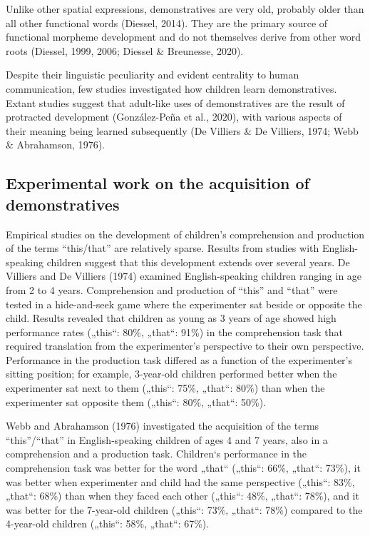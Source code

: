 \documentclass[
  man,floatsintext]{apa6}
\begin{document}
Unlike other spatial expressions, demonstratives are very old, probably older than all other functional words (Diessel, 2014). They are the primary source of functional morpheme development and do not themselves derive from other word roots (Diessel, 1999, 2006; Diessel \& Breunesse, 2020).

Despite their linguistic peculiarity and evident centrality to human communication, few studies investigated how children learn demonstratives. Extant studies suggest that adult-like uses of demonstratives are the result of protracted development (González-Peña et al., 2020), with various aspects of their meaning being learned subsequently (De Villiers \& De Villiers, 1974; Webb \& Abrahamson, 1976).

\subsection{Experimental work on the acquisition of demonstratives}\label{experimental-work-on-the-acquisition-of-demonstratives}

Empirical studies on the development of children's comprehension and production of the terms ``this/that'' are relatively sparse. Results from studies with English-speaking children suggest that this development extends over several years. De Villiers and De Villiers (1974) examined English-speaking children ranging in age from 2 to 4 years. Comprehension and production of ``this'' and ``that'' were tested in a hide-and-seek game where the experimenter sat beside or opposite the child. Results revealed that children as young as 3 years of age showed high performance rates („this``: 80\%, „that``: 91\%) in the comprehension task that required translation from the experimenter's perspective to their own perspective. Performance in the production task differed as a function of the experimenter's sitting position; for example, 3-year-old children performed better when the experimenter sat next to them („this``: 75\%, „that``: 80\%) than when the experimenter sat opposite them („this``: 80\%, „that``: 50\%).

Webb and Abrahamson (1976) investigated the acquisition of the terms ``this''/``that'' in English-speaking children of ages 4 and 7 years, also in a comprehension and a production task. Children`s performance in the comprehension task was better for the word „that`` („this``: 66\%, „that``: 73\%), it was better when experimenter and child had the same perspective („this``: 83\%, „that``: 68\%) than when they faced each other („this``: 48\%, „that``: 78\%), and it was better for the 7-year-old children („this``: 73\%, „that``: 78\%) compared to the 4-year-old children („this``: 58\%, „that``: 67\%).
\end{document}
